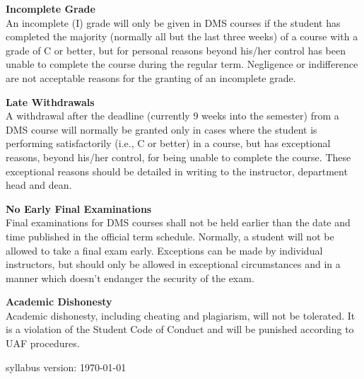 \documentclass[12pt]{article}
\renewcommand{\emph}[1]{\textsf{\textbf{#1}}}
\newcommand{\localhead}[1]{\par\smallskip\textbf{#1}\nobreak\\}%
\def\heading#1{\localhead{\large\emph{#1}}}
\def\subheading#1{\localhead{\emph{#1}}}
\begin{document}
\subheading{Incomplete Grade} 
An incomplete (I) grade will only be given in DMS courses if the student has completed the majority (normally all but the last three weeks) of a course with a grade of C or better, but for personal reasons beyond his/her control has been unable to complete the course during the regular term. Negligence or indifference are not acceptable reasons for the granting of an incomplete grade. 

\subheading{Late Withdrawals} 
A withdrawal after the deadline (currently 9 weeks into the semester) from a DMS course will normally be granted only in cases where the student is performing satisfactorily (i.e., C or better) in a course, but has exceptional reasons, beyond his/her control, for being unable to complete the course. These exceptional reasons should be detailed in writing to the instructor, department head and dean.

\subheading{No Early Final Examinations}
Final examinations for DMS courses shall not be held earlier than the date and time published in the official term schedule. Normally, a student will not be allowed to take a final exam early. Exceptions can be made by individual instructors, but should only be allowed in exceptional circumstances and in a manner which doesn't endanger the security of the exam.

\subheading{Academic Dishonesty}
Academic dishonesty, including cheating and plagiarism, will not be tolerated.  It is a violation of the Student Code of Conduct and will be punished according to UAF procedures.

\vfill
\hfill \scriptsize syllabus version: \today \normalsize

\end{document}
